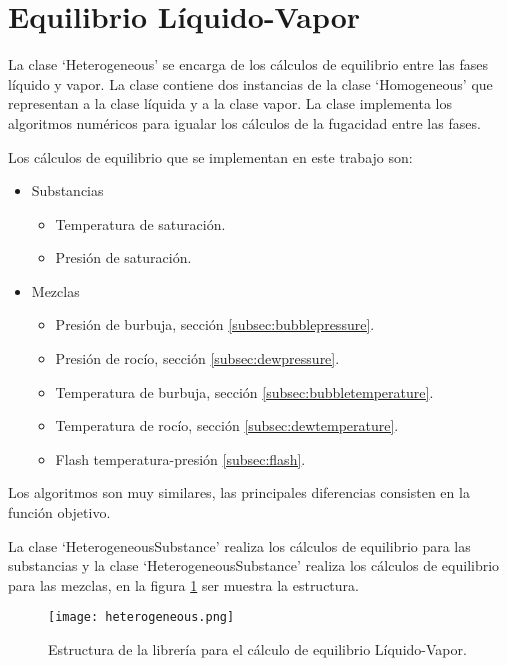 \section{Equilibrio Líquido-Vapor}\label{sec:heterogeneous}

	La clase `Heterogeneous' se encarga de los cálculos de equilibrio entre las fases líquido y vapor. La clase contiene dos instancias de la clase `Homogeneous' que representan a la clase líquida y a la clase vapor. La clase implementa los algoritmos numéricos para igualar los cálculos de la fugacidad entre las fases.

	Los cálculos de equilibrio que se implementan en este trabajo son:

	\begin{itemize}

		\item Substancias
			\begin{itemize}
				\item Temperatura de saturación.
				\item Presión de saturación.
			\end{itemize}

		\item Mezclas
	\begin{itemize}
		\item Presión de burbuja, sección \ref{subsec:bubblepressure}.
		\item Presión de rocío, sección \ref{subsec:dewpressure}.
		\item Temperatura de burbuja, sección \ref{subsec:bubbletemperature}.
		\item Temperatura de rocío, sección \ref{subsec:dewtemperature}.
		\item Flash temperatura-presión \ref{subsec:flash}.
	\end{itemize}

	\end{itemize}

	Los algoritmos son muy similares, las principales diferencias consisten en la función objetivo.

	La clase `HeterogeneousSubstance' realiza los cálculos de equilibrio para las substancias y la clase `HeterogeneousSubstance' realiza los cálculos de equilibrio para las mezclas, en la figura \ref{fig:heterogeneous} ser muestra la estructura.

\begin{figure}[!h]
  \centering
    \texttt{[image: heterogeneous.png]}
    \caption{Estructura de la librería para el cálculo de equilibrio Líquido-Vapor.}
    \label{fig:heterogeneous}
\end{figure}